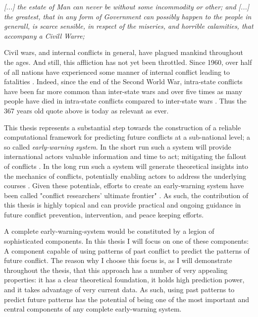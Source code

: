 \documentclass[a4paper]{article}
\begin{document}
\begin{displayquote}
\emph{[...] the estate of Man can never be without some incommodity or other; and [...] the greatest, that in any form of Government can possibly happen to the people in generall, is scarce sensible, in respect of the miseries, and horrible calamities, that accompany a Civill Warre;} \cite[128]{Hobbes_1991}\par
\end{displayquote}

Civil wars, and internal conflicts in general, have plagued mankind throughout the ages. And still, this affliction has not yet been throttled. Since 1960, over half of all nations have experienced some manner of internal conflict leading to fatalities \citep[3-4]{Blattman_Miguel_2010}. Indeed, since the end of the Second World War, intra-state conflicts have been far more common than inter-state wars and over five times as many people have died in intra-state conflicts compared to inter-state wars \citep[563]{Collier_Hoeffler_2004}. Thus the 367 years old quote above is today as relevant as ever.\par

This thesis represents a substantial step towards the construction of a reliable computational framework for predicting future conflicts at a sub-national level; a so called \emph{early-warning system}. In the short run such a system will provide international actors valuable information and time to act; mitigating the fallout of conflicts \citep{Ward_Greenhill_Bakke_2010, perry_2013}. In the long run such a system will generate theoretical insights into the mechanics of conflicts, potentially enabling actors to address the underlying courses \citep{Schrodt_2014, chadefaux2017conflict}. Given these potentials, efforts to create an early-warning system have been called "conflict researchers’ ultimate frontier" \citep[474]{cederman2017predicting}. As such, the contribution of this thesis is highly topical and can provide practical and ongoing guidance in future conflict prevention, intervention, and peace keeping efforts.\par

A complete early-warning-system would be constituted by a legion of sophisticated components. In this thesis I will focus on one of these components: A component capable of using patterns of past conflict to predict the patterns of future conflict. The reason why I choose this focus is, as I will demonstrate throughout the thesis, that this approach has a number of very appealing properties: it has a clear theoretical foundation, it holds high prediction power, and it takes advantage of very current data. As such, using past patterns to predict future patterns has the potential of being one of the most important and central components of any complete early-warning system.\par
\end{document}
